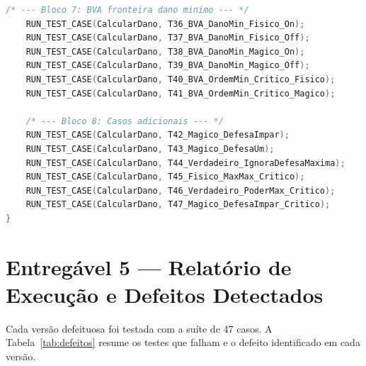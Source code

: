 \documentclass[conference, onecolumn]{IEEEtran}
\begin{document}
\begin{lstlisting}[language=C, caption={TestCalcularDano\_Runner.c --- registra os 47 casos no grupo Unity.}]
    /* --- Bloco 7: BVA fronteira dano minimo --- */
    RUN_TEST_CASE(CalcularDano, T36_BVA_DanoMin_Fisico_On);
    RUN_TEST_CASE(CalcularDano, T37_BVA_DanoMin_Fisico_Off);
    RUN_TEST_CASE(CalcularDano, T38_BVA_DanoMin_Magico_On);
    RUN_TEST_CASE(CalcularDano, T39_BVA_DanoMin_Magico_Off);
    RUN_TEST_CASE(CalcularDano, T40_BVA_OrdemMin_Critico_Fisico);
    RUN_TEST_CASE(CalcularDano, T41_BVA_OrdemMin_Critico_Magico);

    /* --- Bloco 8: Casos adicionais --- */
    RUN_TEST_CASE(CalcularDano, T42_Magico_DefesaImpar);
    RUN_TEST_CASE(CalcularDano, T43_Magico_DefesaUm);
    RUN_TEST_CASE(CalcularDano, T44_Verdadeiro_IgnoraDefesaMaxima);
    RUN_TEST_CASE(CalcularDano, T45_Fisico_MaxMax_Critico);
    RUN_TEST_CASE(CalcularDano, T46_Verdadeiro_PoderMax_Critico);
    RUN_TEST_CASE(CalcularDano, T47_Magico_DefesaImpar_Critico);
}
\end{lstlisting}

\section{Entregável 5 — Relatório de Execução e Defeitos Detectados}

Cada versão defeituosa foi testada com a suíte de 47 casos. A Tabela~\ref{tab:defeitos} resume
os testes que falham e o defeito identificado em cada versão.
\end{document}
